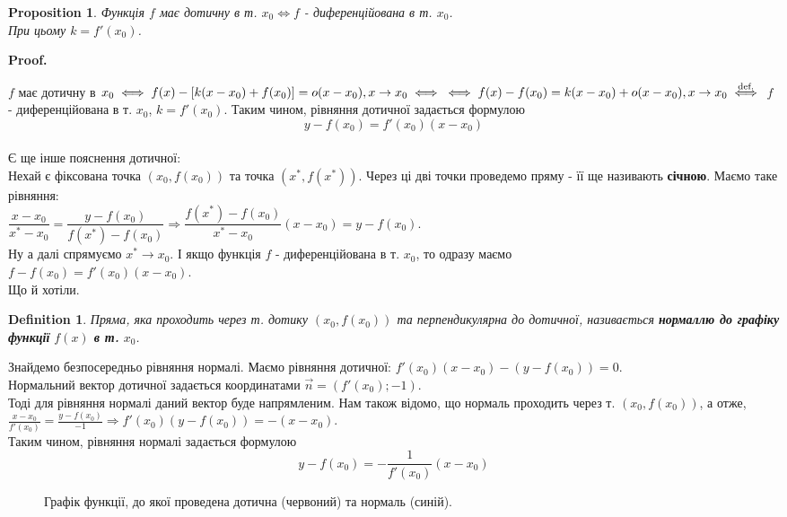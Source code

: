 \documentclass[a4paper, 14pt]{article}
\makeatletter
\def\qed{$\blacksquare$}
\theoremstyle{theoremdd}
\theoremstyle{theoremdd}
\newtheorem{definition}[theorem]{Definition}
\theoremstyle{theoremdd}
\theoremstyle{theoremdd}
\theoremstyle{theoremdd}
\newtheorem{proposition}[theorem]{Proposition}
\theoremstyle{theoremdd}
\theoremstyle{theoremdd}
\theoremstyle{theoremdd}
\renewenvironment{proof}[1][Proof.\\]{\par
\pushQED{\hfill \qed}%
\normalfont \topsep6\p@\@plus6\p@\relax
\trivlist
\item\relax
{\bfseries
#1\@addpunct{.}}\hspace\labelsep\ignorespaces
}{%
\popQED\endtrivlist\@endpefalse
}
\makeatother
\begin{document}
\begin{proposition}
Функція $f$ має дотичну в т. $x_0 \iff f$ - диференційована в т. $x_0$. \\ При цьому $k = f'(x_0)$.
\end{proposition}

\begin{proof}
$f$ має дотичну в $x_0 \iff f(x) - [k(x-x_0)+f(x_0)] = o(x-x_0), x \to x_0 \iff \\ \iff f(x)-f(x_0) = k(x-x_0) + o(x-x_0), x \to x_0 \overset{\textrm{def.}}{\iff}$ $f$ - диференційована в т. $x_0$, $k=f'(x_0)$.
\end{proof}
Таким чином, рівняння дотичної задається формулою $$y - f(x_0) = f'(x_0)(x-x_0)$$
\bigskip \\
Є ще інше пояснення дотичної:\\
Нехай є фіксована точка $(x_0,f(x_0))$ та точка $(x^*,f(x^*))$. Через ці дві точки проведемо пряму - її ще називають \textbf{січною}. Маємо таке рівняння:\\
$\dfrac{x-x_0}{x^*-x_0} = \dfrac{y-f(x_0)}{f(x^*) - f(x_0)} \Rightarrow \dfrac{f(x^*)-f(x_0)}{x^*-x_0}(x-x_0) = y - f(x_0)$.\\
Ну а далі спрямуємо $x^* \to x_0$. І якщо функція $f$ - диференційована в т. $x_0$, то одразу маємо\\
$f - f(x_0) = f'(x_0)(x-x_0)$.\\
Що й хотіли.

\begin{definition}
Пряма, яка проходить через т. дотику $(x_0, f(x_0))$ та перпендикулярна до дотичної, називається \textbf{нормаллю до графіку функції} $f(x)$ \textbf{в т.} $x_0$.
\end{definition}

Знайдемо безпосередньо рівняння нормалі. Маємо рівняння дотичної:
$f'(x_0)(x-x_0) - (y-f(x_0)) = 0$.\\
Нормальний вектор дотичної задається координатами $\vec{n} = (f'(x_0); -1)$.\\
Тоді для рівняння нормалі даний вектор буде напрямленим. Нам також відомо, що нормаль проходить через т. $(x_0,f(x_0))$, а отже,\\
$\displaystyle \frac{x-x_0}{f'(x_0)} = \frac{y-f(x_0)}{-1} \Rightarrow f'(x_0)(y-f(x_0)) = -(x-x_0)$.\\
Таким чином, рівняння нормалі задається формулою $$y-f(x_0) = \displaystyle -\frac{1}{f'(x_0)}(x-x_0)$$
\begin{figure}[H]
\centering
{}
	\caption*{Графік функції, до якої проведена дотична (червоний) та нормаль (синій).}
\end{figure}
\end{document}
